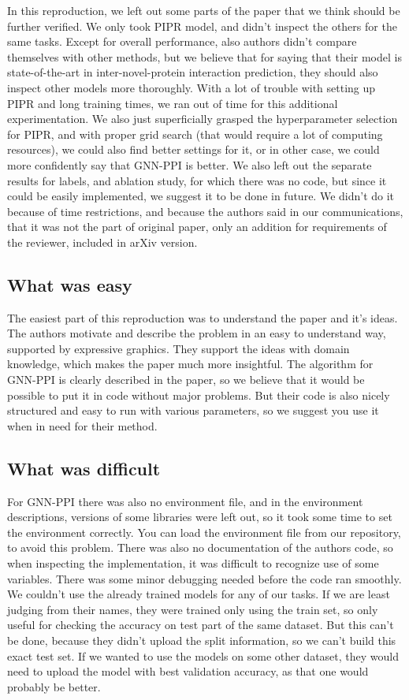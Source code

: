 In this reproduction, we left out some parts of the paper that we think should be further verified. We only took PIPR model, and didn't inspect the others for the same tasks. Except for overall performance, also authors didn't compare themselves with other methods, but we believe that for saying that their model is state-of-the-art in inter-novel-protein interaction prediction, they should also inspect other models more thoroughly. With a lot of trouble with setting up PIPR and long training times, we ran out of time for this additional experimentation. 
We also just superficially grasped the hyperparameter selection for PIPR, and with proper grid search (that would require a lot of computing resources), we could also find better settings for it, or in other case, we could more confidently say that GNN-PPI is better.
We also left out the separate results for labels, and ablation study, for which there was no code, but since it could be easily implemented, we suggest it to be done in future. We didn't do it because of time restrictions, and because the authors said in our communications, that it was not the part of original paper, only an addition for requirements of the reviewer, included in arXiv version.

\subsection{What was easy}
The easiest part of this reproduction was to understand the paper and it's ideas. The authors motivate and describe the problem in an easy to understand way, supported by expressive graphics. They support the ideas with domain knowledge, which makes the paper much more insightful. The algorithm for GNN-PPI is clearly described in the paper, so we believe that it would be possible to put it in code without major problems. But their code is also nicely structured and easy to run with various parameters, so we suggest you use it when in need for their method. 

\subsection{What was difficult}
For GNN-PPI there was also no environment file, and in the environment descriptions, versions of some libraries were left out, so it took some time to set the environment correctly. You can load the environment file from our repository, to avoid this problem. There was also no documentation of the authors code, so when inspecting the implementation, it was difficult to recognize use of some variables. There was some minor debugging needed before the code ran smoothly. We couldn't use the already trained models for any of our tasks. If we are least judging from their names, they were trained only using the train set, so only useful for checking the accuracy on test part of the same dataset. But this can't be done, because they didn't upload the split information, so we can't build this exact test set. If we wanted to use the models on some other dataset, they would need to upload the model with best validation accuracy, as that one would probably be better.

